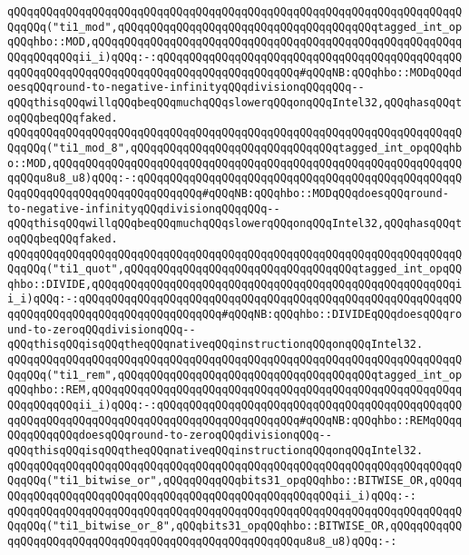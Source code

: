 \verb|qQQqqQQqqQQqqQQqqQQqqQQqqQQqqQQqqQQqqQQqqQQqqQQqqQQqqQQqqQQqqQQqqQQqqQQqqQQq("ti1_mod",qQQqqQQqqQQqqQQqqQQqqQQqqQQqqQQqqQQqqQQqtagged_int_opqQQqhbo::MOD,qQQqqQQqqQQqqQQqqQQqqQQqqQQqqQQqqQQqqQQqqQQqqQQqqQQqqQQqqQQqqQQqqQQqii_i)qQQq:-:qQQqqQQqqQQqqQQqqQQqqQQqqQQqqQQqqQQqqQQqqQQqqQQqqQQqqQQqqQQqqQQqqQQqqQQqqQQqqQQqqQQqqQQqqQQq#qQQqNB:qQQqhbo::MODqQQqdoesqQQqround-to-negative-infinityqQQqdivisionqQQqqQQq--qQQqthisqQQqwillqQQqbeqQQqmuchqQQqslowerqQQqonqQQqIntel32,qQQqhasqQQqtoqQQqbeqQQqfaked.|\newline
\verb|qQQqqQQqqQQqqQQqqQQqqQQqqQQqqQQqqQQqqQQqqQQqqQQqqQQqqQQqqQQqqQQqqQQqqQQqqQQq("ti1_mod_8",qQQqqQQqqQQqqQQqqQQqqQQqqQQqqQQqtagged_int_opqQQqhbo::MOD,qQQqqQQqqQQqqQQqqQQqqQQqqQQqqQQqqQQqqQQqqQQqqQQqqQQqqQQqqQQqqQQqqQQqu8u8_u8)qQQq:-:qQQqqQQqqQQqqQQqqQQqqQQqqQQqqQQqqQQqqQQqqQQqqQQqqQQqqQQqqQQqqQQqqQQqqQQqqQQqqQQq#qQQqNB:qQQqhbo::MODqQQqdoesqQQqround-to-negative-infinityqQQqdivisionqQQqqQQq--qQQqthisqQQqwillqQQqbeqQQqmuchqQQqslowerqQQqonqQQqIntel32,qQQqhasqQQqtoqQQqbeqQQqfaked.|\newline
\newline
\verb|qQQqqQQqqQQqqQQqqQQqqQQqqQQqqQQqqQQqqQQqqQQqqQQqqQQqqQQqqQQqqQQqqQQqqQQqqQQq("ti1_quot",qQQqqQQqqQQqqQQqqQQqqQQqqQQqqQQqqQQqtagged_int_opqQQqhbo::DIVIDE,qQQqqQQqqQQqqQQqqQQqqQQqqQQqqQQqqQQqqQQqqQQqqQQqqQQqqQQqii_i)qQQq:-:qQQqqQQqqQQqqQQqqQQqqQQqqQQqqQQqqQQqqQQqqQQqqQQqqQQqqQQqqQQqqQQqqQQqqQQqqQQqqQQqqQQqqQQqqQQq#qQQqNB:qQQqhbo::DIVIDEqQQqdoesqQQqround-to-zeroqQQqdivisionqQQq--qQQqthisqQQqisqQQqtheqQQqnativeqQQqinstructionqQQqonqQQqIntel32.|\newline
\newline
\verb|qQQqqQQqqQQqqQQqqQQqqQQqqQQqqQQqqQQqqQQqqQQqqQQqqQQqqQQqqQQqqQQqqQQqqQQqqQQq("ti1_rem",qQQqqQQqqQQqqQQqqQQqqQQqqQQqqQQqqQQqqQQqtagged_int_opqQQqhbo::REM,qQQqqQQqqQQqqQQqqQQqqQQqqQQqqQQqqQQqqQQqqQQqqQQqqQQqqQQqqQQqqQQqqQQqii_i)qQQq:-:qQQqqQQqqQQqqQQqqQQqqQQqqQQqqQQqqQQqqQQqqQQqqQQqqQQqqQQqqQQqqQQqqQQqqQQqqQQqqQQqqQQqqQQqqQQq#qQQqNB:qQQqhbo::REMqQQqqQQqqQQqqQQqdoesqQQqround-to-zeroqQQqdivisionqQQq--qQQqthisqQQqisqQQqtheqQQqnativeqQQqinstructionqQQqonqQQqIntel32.|\newline
\newline
\verb|qQQqqQQqqQQqqQQqqQQqqQQqqQQqqQQqqQQqqQQqqQQqqQQqqQQqqQQqqQQqqQQqqQQqqQQqqQQq("ti1_bitwise_or",qQQqqQQqqQQqbits31_opqQQqhbo::BITWISE_OR,qQQqqQQqqQQqqQQqqQQqqQQqqQQqqQQqqQQqqQQqqQQqqQQqqQQqqQQqii_i)qQQq:-:|\newline
\verb|qQQqqQQqqQQqqQQqqQQqqQQqqQQqqQQqqQQqqQQqqQQqqQQqqQQqqQQqqQQqqQQqqQQqqQQqqQQq("ti1_bitwise_or_8",qQQqbits31_opqQQqhbo::BITWISE_OR,qQQqqQQqqQQqqQQqqQQqqQQqqQQqqQQqqQQqqQQqqQQqqQQqqQQqqQQqu8u8_u8)qQQq:-:|\newline
